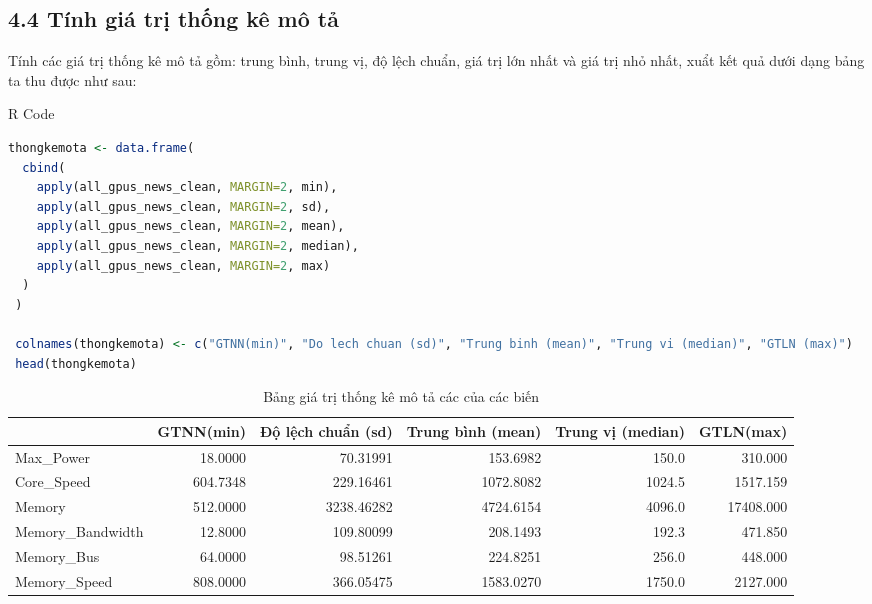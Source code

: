 \documentclass[a4paper]{article}
\newcommand{\gachdau}{\hspace*{1.5em}\ignorespaces}
\begin{document}
\newpage
        \subsection*{4.4 Tính giá trị thống kê mô tả}
            \gachdau
            Tính các giá trị thống kê mô tả gồm: trung bình, trung vị, độ lệch chuẩn, giá trị lớn nhất và giá trị nhỏ nhất, xuẩt kết quả dưới dạng bảng ta thu được như sau:
            
\begin{mybox}{R Code}
\begin{lstlisting}[language={R}] 
 thongkemota <- data.frame(
  cbind(
    apply(all_gpus_news_clean, MARGIN=2, min),
    apply(all_gpus_news_clean, MARGIN=2, sd),
    apply(all_gpus_news_clean, MARGIN=2, mean),
    apply(all_gpus_news_clean, MARGIN=2, median),
    apply(all_gpus_news_clean, MARGIN=2, max)
  )
 )

 colnames(thongkemota) <- c("GTNN(min)", "Do lech chuan (sd)", "Trung binh (mean)", "Trung vi (median)", "GTLN (max)")
 head(thongkemota)
\end{lstlisting}
\end{mybox}
            
            \begin{table}[htbp]
              \centering
              \scriptsize
              \caption{Bảng giá trị thống kê mô tả các của các biến}
              \begin{tabular}{lrrrrr}
                \toprule
                & GTNN(min) & Độ lệch chuẩn (sd) & Trung bình (mean) & Trung vị (median) & GTLN(max) \\
                \midrule
                Max\_Power          & 18.0000     & 70.31991          & 153.6982            & 150.0    & 310.000 \\
                Core\_Speed        & 604.7348    & 229.16461         & 1072.8082           & 1024.5   & 1517.159 \\
                Memory            & 512.0000    & 3238.46282        & 4724.6154           & 4096.0   & 17408.000 \\
                Memory\_Bandwidth   & 12.8000     & 109.80099         & 208.1493            & 192.3    & 471.850 \\
                Memory\_Bus         & 64.0000     & 98.51261          & 224.8251            & 256.0    & 448.000 \\
                Memory\_Speed      & 808.0000    & 366.05475         & 1583.0270           & 1750.0   & 2127.000 \\
                \bottomrule
              \end{tabular}
            \end{table}
            
\end{document}
